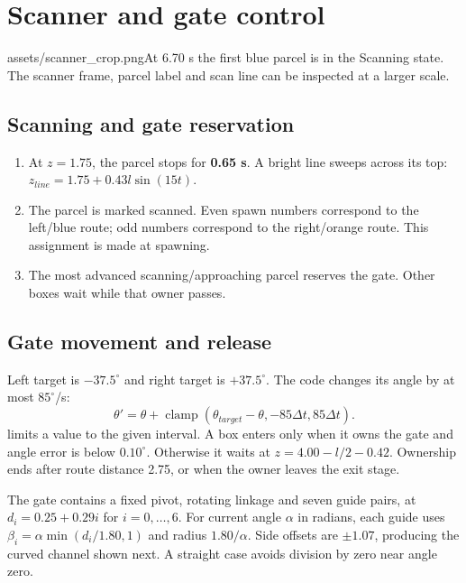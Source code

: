 \section{Scanner and gate control}
\label{sec:scanner_gate}
\begin{shot}{assets/scanner_crop.png}{At 6.70 s the first blue parcel is in the Scanning state. The scanner frame, parcel label and scan line can be inspected at a larger scale.}
\end{shot}
\subsection{Scanning and gate reservation}
\begin{enumerate}
\item At $z=1.75$, the parcel stops for \textbf{0.65 s}. A bright line sweeps across its top: $z_{line}=1.75+0.43l\sin(15t)$.
\item The parcel is marked scanned. Even spawn numbers correspond to the left/blue route; odd numbers correspond to the right/orange route. This assignment is made at spawning.
\item The most advanced scanning/approaching parcel reserves the gate. Other boxes wait while that owner passes.
\end{enumerate}
\subsection{Gate movement and release}
Left target is $-37.5^\circ$ and right target is $+37.5^\circ$. The code changes its angle by at most $85^\circ$/s:
\begin{equation}
\theta'=\theta+\operatorname{clamp}(\theta_{target}-\theta,-85\Delta t,85\Delta t).
\end{equation}
 limits a value to the given interval. A box enters only when it owns the gate and angle error is below $0.10^\circ$. Otherwise it waits at $z=4.00-l/2-0.42$. Ownership ends after route distance 2.75, or when the owner leaves the exit stage.

The gate contains a fixed pivot, rotating linkage and seven guide pairs, at $d_i=0.25+0.29i$ for $i=0,\ldots,6$. For current angle $\alpha$ in radians, each guide uses $\beta_i=\alpha\min(d_i/1.80,1)$ and radius $1.80/\alpha$. Side offsets are $\pm1.07$, producing the curved channel shown next. A straight case avoids division by zero near angle zero.
